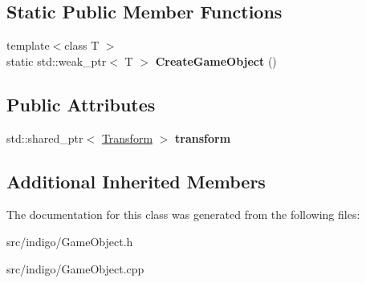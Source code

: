 \subsection*{Static Public Member Functions}
\begin{DoxyCompactItemize}
\item 
\mbox{\label{class_indigo_1_1_game_object_ac6c3b74cc503f36f7b834f395fd2f2e2}} 
{\footnotesize template$<$class T $>$ }\\static std\+::weak\+\_\+ptr$<$ T $>$ {\bfseries Create\+Game\+Object} ()
\end{DoxyCompactItemize}
\subsection*{Public Attributes}
\begin{DoxyCompactItemize}
\item 
\mbox{\label{class_indigo_1_1_game_object_a807115c579b93b60fbf69a85ac31a65c}} 
std\+::shared\+\_\+ptr$<$ \hyperlink{class_indigo_1_1_transform}{Transform} $>$ {\bfseries transform}
\end{DoxyCompactItemize}
\subsection*{Additional Inherited Members}


The documentation for this class was generated from the following files\+:\begin{DoxyCompactItemize}
\item 
src/indigo/Game\+Object.\+h\item 
src/indigo/Game\+Object.\+cpp\end{DoxyCompactItemize}
